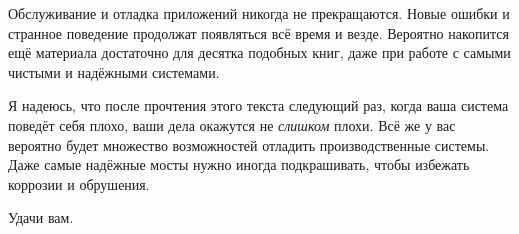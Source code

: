\documentclass[11pt, oneside]{book}   	%
\begin{document}
Обслуживание и отладка приложений никогда не прекращаются. Новые ошибки и странное поведение продолжат появляться всё время и везде. Вероятно накопится ещё материала достаточно для десятка подобных книг, даже при работе с самыми чистыми и надёжными системами.

Я надеюсь, что после прочтения этого текста следующий раз, когда ваша система поведёт себя плохо, ваши дела окажутся не \emph{слишком} плохи. Всё же у вас вероятно будет множество возможностей отладить производственные системы. Даже самые надёжные мосты нужно иногда подкрашивать, чтобы избежать коррозии и обрушения.

Удачи вам.
\end{document}
